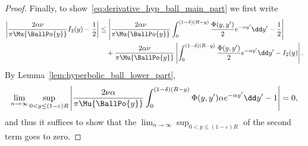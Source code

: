 \begin{proof}
Finally, to show~\eqref{eq:derivative_hyp_ball_main_part} we first write
\begin{align*}
	\left|\frac{2\alpha \nu}{\pi \Mu{\BallPo{y}}} I_2(y) - \frac{1}{2}\right|
	&\le \left|\frac{2\alpha \nu}{\pi \Mu{\BallPo{y}}}  \int_0^{(1-\delta)(R- y)} \frac{\Phi(y,y^\prime)}{2} 
		e^{-\alpha y^\prime} \dd y^\prime - \frac{1}{2}\right| \\
	&\hspace{10pt}+ \frac{2\alpha \nu}{\pi \Mu{\BallPo{y}}}\left|\int_0^{(1-\delta)(R- y)} 
		\frac{\Phi(y,y^\prime)}{2} e^{-\alpha y^\prime} \dd y^\prime - I_2(y)\right|.
\end{align*}
By Lemma~\ref{lem:hyperbolic_ball_lower_part},
\[
	\lim_{n \to \infty} \sup_{0 < y \le (1-\varepsilon)R} \left|\frac{2\nu \alpha}{\pi \Mu{\BallPo{y}}} 
	\int_{0}^{(1-\delta)(R-y)} \Phi(y,y^\prime) \alpha e^{-\alpha y^\prime} \dd y^\prime
	- 1\right| = 0,
\] 
and thus it suffices to show that the $\lim_{n \to \infty} \sup_{0 < y \le (1-\varepsilon)R}$ of the second term goes to zero.


\end{proof}
